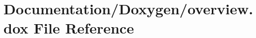 \hypertarget{overview_8dox}{}\section{Documentation/\+Doxygen/overview.dox File Reference}
\label{overview_8dox}
